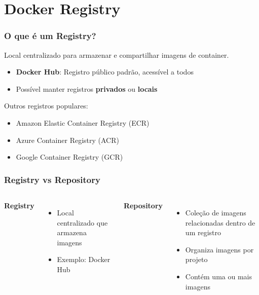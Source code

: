 \section{Docker Registry}

\begin{frame}
  \frametitle{O que é um Registry?}
  Local centralizado para armazenar e compartilhar imagens de container.

  \vspace{0.5em}
  \begin{itemize}
    \item \textbf{Docker Hub}: Registro público padrão, acessível a todos
    \item Possível manter registros \textbf{privados} ou \textbf{locais}
  \end{itemize}

  \vspace{0.5em}
  Outros registros populares:
  \begin{itemize}
    \item Amazon Elastic Container Registry (ECR)
    \item Azure Container Registry (ACR)
    \item Google Container Registry (GCR)
  \end{itemize}
\end{frame}

\begin{frame}
  \frametitle{Registry vs Repository}
  \begin{columns}
      \textbf{Registry}
      \begin{itemize}
        \item Local centralizado que armazena imagens
        \item Exemplo: Docker Hub
      \end{itemize}

      \textbf{Repository}
      \begin{itemize}
        \item Coleção de imagens relacionadas dentro de um registro
        \item Organiza imagens por projeto
        \item Contém uma ou mais imagens
      \end{itemize}
  \end{columns}
\end{frame}


